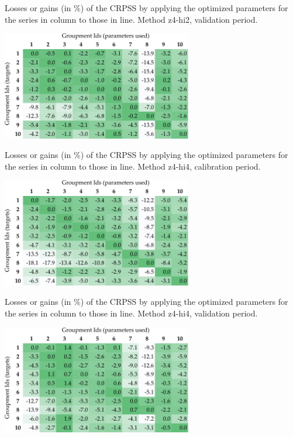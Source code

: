\documentclass[twocol]{ametsoc}
\begin{document}
\begin{table}[htb]
	\caption{Losses or gains (in \%) of the CRPSS by applying the optimized parameters for the series in column to those in line. Method z4-hi2, validation period.}
	\centerline{\includegraphics[width=8.3cm]{figures/table_crossing_z4-hi2_valid.pdf}}
	\label{table:crossing_z4-hi2_valid}
\end{table}

\begin{table}[htb]
	\caption{Losses or gains (in \%) of the CRPSS by applying the optimized parameters for the series in column to those in line. Method z4-hi4, calibration period.}
	\centerline{\includegraphics[width=8.3cm]{figures/table_crossing_z4-hi4_calib.pdf}}
	\label{table:crossing_z4-hi4_calib}
\end{table}

\begin{table}[htb]
	\caption{Losses or gains (in \%) of the CRPSS by applying the optimized parameters for the series in column to those in line. Method z4-hi4, validation period.}
	\centerline{\includegraphics[width=8.3cm]{figures/table_crossing_z4-hi4_valid.pdf}}
	\label{table:crossing_z4-hi4_valid}
\end{table}
\end{document}
